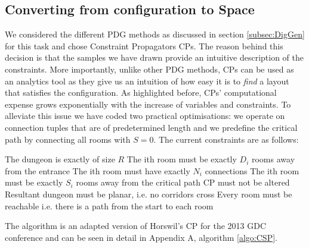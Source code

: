 \documentclass{UoYCSproject}
\begin{document}
\subsection{Converting from configuration to Space}
\label{subsec:CSP}
 We considered the different PDG methods as discussed in section \ref{subsec:DigGen} for this task and chose Constraint Propagators CPs. The reason behind this decision is that the samples we have drawn provide an intuitive description of the constraints. More importantly, unlike other PDG methods, CPs can be used as an analytics tool as they give us an intuition of how easy it is to \textit{find} a layout that satisfies the configuration. As highlighted before, CPs' computational expense grows exponentially with the increase of variables and constraints. To alleviate this issue we have coded two practical optimisations: we operate on connection tuples that are of predetermined length and we predefine the critical path by connecting all rooms with \(S = 0\). The current constraints are as follows:
\begin{outline}[enumerate]
  \1 The dungeon is exactly of size \(R\)
  \1 The ith room must be exactly \(D_i\) rooms away from the entrance
  \1 The ith room must have exactly \(N_i\) connections 
  \1 The ith room must be exactly \(S_i\) rooms away from the critical path
  \1 CP must not be altered
  \1 Resultant dungeon must be planar, i.e. no corridors cross
  \1 Every room must be reachable i.e. there is a path from the start to each room
\end{outline}

The algorithm is an adapted version of Horswil's CP for the 2013 GDC conference \parencite{HorswillCPInAWeekend} and can be seen in detail in Appendix A, algorithm \ref{algo:CSP}.
\end{document}
